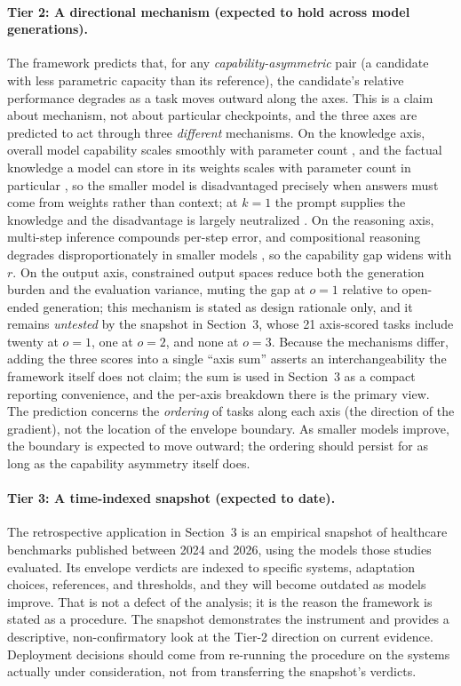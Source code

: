\documentclass[11pt]{article}
\begin{document}
\paragraph{Tier 2: A directional mechanism (expected to hold across model generations).}
The framework predicts that, for any \emph{capability-asymmetric} pair (a candidate with less parametric capacity than its reference), the candidate's relative performance degrades as a task moves outward along the axes. This is a claim about mechanism, not about particular checkpoints, and the three axes are predicted to act through three \emph{different} mechanisms. On the knowledge axis, overall model capability scales smoothly with parameter count \cite{Kaplan2020}, and the factual knowledge a model can store in its weights scales with parameter count in particular \cite{AllenZhu2024}, so the smaller model is disadvantaged precisely when answers must come from weights rather than context; at $k=1$ the prompt supplies the knowledge and the disadvantage is largely neutralized \cite{Lewis2020, Mallen2023}. On the reasoning axis, multi-step inference compounds per-step error, and compositional reasoning degrades disproportionately in smaller models \cite{Wei2022, Dziri2023}, so the capability gap widens with $r$. On the output axis, constrained output spaces reduce both the generation burden and the evaluation variance, muting the gap at $o=1$ relative to open-ended generation; this mechanism is stated as design rationale only, and it remains \emph{untested} by the snapshot in Section~3, whose 21 axis-scored tasks include twenty at $o=1$, one at $o=2$, and none at $o=3$. Because the mechanisms differ, adding the three scores into a single ``axis sum'' asserts an interchangeability the framework itself does not claim; the sum is used in Section~3 as a compact reporting convenience, and the per-axis breakdown there is the primary view. The prediction concerns the \emph{ordering} of tasks along each axis (the direction of the gradient), not the location of the envelope boundary. As smaller models improve, the boundary is expected to move outward; the ordering should persist for as long as the capability asymmetry itself does.

\paragraph{Tier 3: A time-indexed snapshot (expected to date).}
The retrospective application in Section~3 is an empirical snapshot of healthcare benchmarks published between 2024 and 2026, using the models those studies evaluated. Its envelope verdicts are indexed to specific systems, adaptation choices, references, and thresholds, and they will become outdated as models improve. That is not a defect of the analysis; it is the reason the framework is stated as a procedure. The snapshot demonstrates the instrument and provides a descriptive, non-confirmatory look at the Tier-2 direction on current evidence. Deployment decisions should come from re-running the procedure on the systems actually under consideration, not from transferring the snapshot's verdicts.
\end{document}
